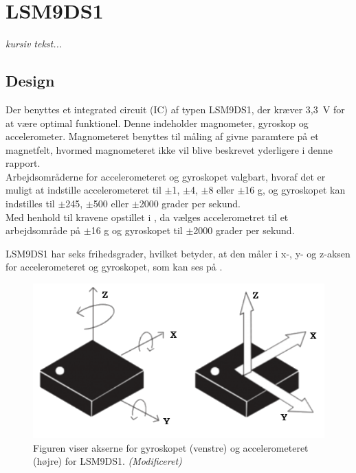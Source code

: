 \section{LSM9DS1}\label{sec_design_LSM9DS1}
\textit{kursiv tekst...}

\subsection{Design}
Der benyttes et integrated circuit (IC) af typen LSM9DS1, der kræver 3,3~V for at være optimal funktionel. Denne indeholder magnometer, gyroskop og accelerometer. Magnometeret benyttes til måling af givne paramtere på et magnetfelt, hvormed magnometeret ikke vil blive beskrevet yderligere i denne rapport. \\
Arbejdsområderne for accelerometeret og gyroskopet valgbart, hvoraf det er muligt at indstille accelerometeret til $\pm$1, $\pm$4, $\pm$8 eller $\pm$16 g, og gyroskopet kan indstilles til $\pm$245, $\pm$500 eller $\pm$2000 grader per sekund. \citep{Jimb02016,STMicroelectronics2016} \\
Med henhold til kravene opstillet i , da vælges accelerometret til et arbejdsområde på  $\pm$16 g og gyroskopet til $\pm$2000 grader per sekund. 

LSM9DS1 har seks frihedsgrader, hvilket betyder, at den måler i x-, y- og z-aksen for accelerometeret og gyroskopet, som kan ses på . %
\citep{STMicroelectronics2016}\newline 
\begin{figure}[H]
	\centering
	\includegraphics[scale=0.6]{figures/cDesign/LSM9DS1.png}
	\caption{Figuren viser akserne for gyroskopet (venstre) og accelerometeret (højre) for LSM9DS1. \citep{Jimb02016} \textit{(Modificeret)}}
	\label{vores_IC}
\end{figure}

